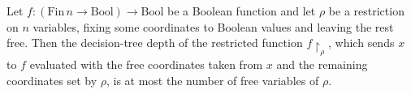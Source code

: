 \begin{lemma}
\label{SwitchingLemma.dtDepth_restrictFn_le_numFree}
\leanok
{}
Let $f : (\mathrm{Fin}\,n \to \mathrm{Bool}) \to \mathrm{Bool}$ be a Boolean function
and let $\rho$ be a restriction on $n$ variables, fixing some coordinates to Boolean
values and leaving the rest free. Then the decision-tree depth of the restricted
function $f\!\restriction_\rho$, which sends $x$ to $f$ evaluated with the free
coordinates taken from $x$ and the remaining coordinates set by $\rho$, is at most the
number of free variables of $\rho$.
\end{lemma}
